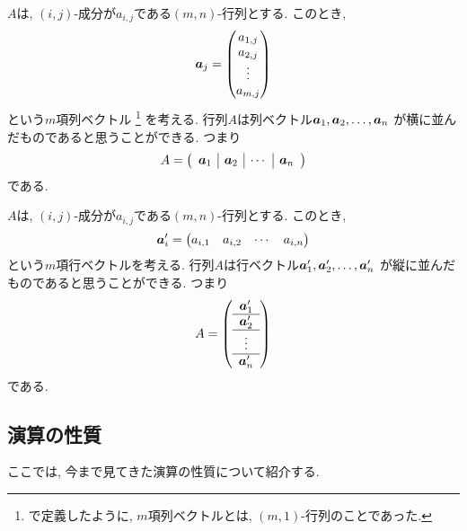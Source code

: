 \begin{remark}
  $A$は, $(i,j)$-成分が$a_{i,j}$である$(m,n)$-行列とする.
  このとき,
  \begin{align*}
    \boldsymbol{a}_j=\begin{pmatrix}a_{1,j}\\a_{2,j}\\\vdots\\a_{m,j}\end{pmatrix}
  \end{align*}
  という$m$項列ベクトル%
  \footnote{で定義したように,
  $m$項列ベクトルとは, $(m,1)$-行列のことであった.}
  を考える.
  行列$A$は列ベクトル$\boldsymbol{a}_{1},\boldsymbol{a}_2,\ldots,\boldsymbol{a}_{n}$
  が横に並んだものであると思うことができる.
  つまり
  \begin{align*}
    A=\left(\begin{array}{c|c|c|c}\boldsymbol{a}_{1}&\boldsymbol{a}_2&\cdots&\boldsymbol{a}_{n}\end{array}\right)
  \end{align*}
  である.
\end{remark}

\begin{remark}
  $A$は, $(i,j)$-成分が$a_{i,j}$である$(m,n)$-行列とする.
  このとき,
  \begin{align*}
    \boldsymbol{a}'_i=\begin{pmatrix}a_{i,1}&a_{i,2}&\cdots&a_{i,n}\end{pmatrix}
  \end{align*}
  という$m$項行ベクトルを考える.
  行列$A$は行ベクトル$\boldsymbol{a}'_{1},\boldsymbol{a}'_2,\ldots,\boldsymbol{a}'_{n}$
  が縦に並んだものであると思うことができる.
  つまり
  \begin{align*}
    A=\left(\begin{array}{c}\boldsymbol{a}'_{1}\\\hline\boldsymbol{a}'_2\\\hline\vdots\\\hline\boldsymbol{a}'_{n}\end{array}\right)
  \end{align*}
  である.
\end{remark}



\subsection{演算の性質}
ここでは, 今まで見てきた演算の性質について紹介する.


